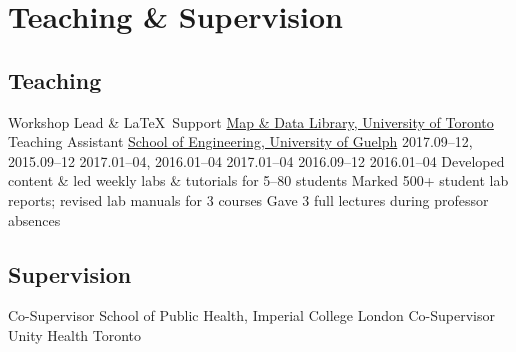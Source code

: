 \section{Teaching \& Supervision}\twodate
\subsection{Teaching}
  {Workshop Lead \& \LaTeX\ Support}
  {\href{https://mdl.library.utoronto.ca}{Map \& Data Library, University of Toronto}}
  {Teaching Assistant}
  {\href{https://www.uoguelph.ca/engineering}{School of Engineering, University of Guelph}}
     {2017.09--12, 2015.09--12}
       {2017.01--04, 2016.01--04}
     {2017.01--04}
              {2016.09--12}
   {2016.01--04}
  \bullet Developed content \& led weekly labs \& tutorials for 5--80 students
  \bullet Marked 500+ student lab reports; revised lab manuals for 3 courses
  \bullet Gave 3 full lectures during professor absences
\subsection{Supervision}
  {Co-Supervisor}
  {School of Public Health, Imperial College London}
  {Co-Supervisor}
  {Unity Health Toronto}
\vspace{1em} %

